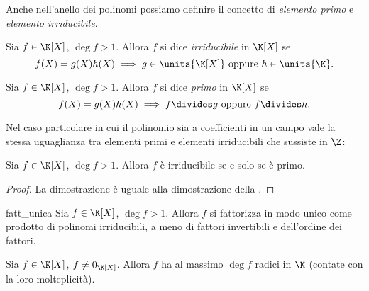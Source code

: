 Anche nell'anello dei polinomi possiamo definire il concetto di \emph{elemento primo} e \emph{elemento irriducibile}.

\begin{definition}
    Sia $f \in \K[X]$, $\deg f > 1$. Allora $f$ si dice \emph{irriducibile} in $\K[X]$ se \[
        f(X) = g(X)h(X) \implies g \in \units{\K[X]} \text{ oppure } h \in \units{\K}.
    \]
\end{definition}

\begin{definition}
    Sia $f \in \K[X]$, $\deg f > 1$. Allora $f$ si dice \emph{primo} in $\K[X]$ se \[
        f(X) = g(X)h(X) \implies f \divides g \text{ oppure } f \divides h.
    \]
\end{definition}

Nel caso particolare in cui il polinomio sia a coefficienti in un campo vale la stessa uguaglianza tra elementi primi e elementi irriducibili che sussiste in $\Z$:

\begin{proposition}
    Sia $f \in \K[X]$, $\deg f > 1$. Allora $f$ è irriducibile se e solo se è primo.
\end{proposition}
\begin{proof}
    La dimostrazione è uguale alla dimostrazione della .
\end{proof}

\begin{theorem}
    {fatt_unica}
    Sia $f \in \K[X]$, $\deg f > 1$. Allora $f$ si fattorizza in modo unico come prodotto di polinomi irriducibili, a meno di fattori invertibili e dell'ordine dei fattori.
\end{theorem}

\begin{corollary}
    Sia $f \in \K[X]$, $f \neq 0_{\K[X]}$. Allora $f$ ha al massimo $\deg f$ radici in $\K$ (contate con la loro molteplicità).
\end{corollary}